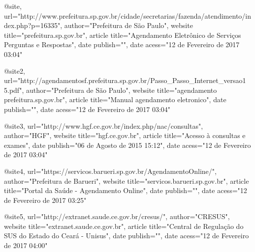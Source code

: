 @{site,
    url={"http://www.prefeitura.sp.gov.br/cidade/secretarias/fazenda/atendimento/index.php?p=16335"},
    author={"Prefeitura de São Paulo"},
    website title={"prefeitura.sp.gov.br"},
    article title={"Agendamento Eletrônico de Serviços Perguntas e Respostas"},
    date publish={""},
    date acess={"12 de Fevereiro de 2017 03:04"}
}

@{site2,
    url={"http://agendamentosf.prefeitura.sp.gov.br/Passo_Passo_Internet_versao1 5.pdf"},
    author={"Prefeitura de São Paulo"},
    website title={"agendamento prefeitura.sp.gov.br"},
    article title={"Manual agendamento eletronico"},
    date publish={""},
    date acess={"12 de Fevereiro de 2017 03:04"}
}

@{site3,
    url={"http://www.hgf.ce.gov.br/index.php/nac/consultas"},
    author={"HGF"},
    website title={"hgf.ce.gov.br"},
    article title={"Acesso à consultas e exames"},
    date publish={"06 de Agosto de 2015 15:12"},
    date acess={"12 de Fevereiro de 2017 03:04"}
}

@{site4,
    url={"https://servicos.barueri.sp.gov.br/AgendamentoOnline/"},
    author={"Prefeitura de Barueri"},
    website title={"servicos.barueri.sp.gov.br"},
    article title={"Portal da Saúde - Agendamento Online"},
    date publish={""},
    date acess={"12 de Fevereiro de 2017 03:25"}
}



@{site5,
    url={"http://extranet.saude.ce.gov.br/cresus/"},
    author={"CRESUS"},
    website title={"extranet.saude.ce.gov.br"},
    article title={"Central de Regulação do SUS do Estado do Ceará - Unisus"},
    date publish={""},
    date acess={"12 de Fevereiro de 2017 04:00"}
}